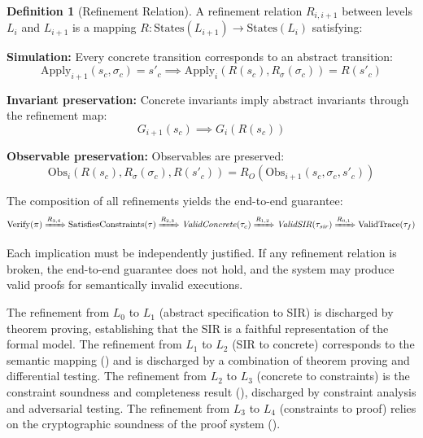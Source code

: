\documentclass[11pt,a4paper]{article}
\theoremstyle{definition}
\newtheorem{definition}{Definition}[section]
\newcommand{\Apply}{\mathrm{Apply}}
\newcommand{\Obs}{\mathrm{Obs}}
\newcommand{\Verify}{\mathrm{Verify}}
\newcommand{\ValidTrace}{\mathrm{ValidTrace}}
\newcommand{\SatisfiesConstraints}{\mathrm{SatisfiesConstraints}}
\begin{document}
\begin{definition}[Refinement Relation]
\label{def:refinement-relation}
A refinement relation $R_{i,i+1}$ between levels $L_i$ and $L_{i+1}$ is a mapping $R: \mathrm{States}(L_{i+1}) \to \mathrm{States}(L_i)$ satisfying:

\noindent\textbf{Simulation:} Every concrete transition corresponds to an abstract transition:
\begin{equation}
\Apply_{i+1}(s_c, \sigma_c) = s'_c \implies \Apply_i(R(s_c), R_\sigma(\sigma_c)) = R(s'_c)
\end{equation}

\noindent\textbf{Invariant preservation:} Concrete invariants imply abstract invariants through the refinement map:
\begin{equation}
G_{i+1}(s_c) \implies G_i(R(s_c))
\end{equation}

\noindent\textbf{Observable preservation:} Observables are preserved:
\begin{equation}
\Obs_i(R(s_c), R_\sigma(\sigma_c), R(s'_c)) = R_O(\Obs_{i+1}(s_c, \sigma_c, s'_c))
\end{equation}
\end{definition}

The composition of all refinements yields the end-to-end guarantee:
\begin{equation}
\Verify(\pi) \xRightarrow{R_{3,4}} \SatisfiesConstraints(\tau) \xRightarrow{R_{2,3}} \mathit{ValidConcrete}(\tau_c) \xRightarrow{R_{1,2}} \mathit{ValidSIR}(\tau_{\mathit{sir}}) \xRightarrow{R_{0,1}} \ValidTrace(\tau_f)
\end{equation}

Each implication must be independently justified. If any refinement relation is broken, the end-to-end guarantee does not hold, and the system may produce valid proofs for semantically invalid executions.

The refinement from $L_0$ to $L_1$ (abstract specification to SIR) is discharged by theorem proving, establishing that the SIR is a faithful representation of the formal model. The refinement from $L_1$ to $L_2$ (SIR to concrete) corresponds to the semantic mapping () and is discharged by a combination of theorem proving and differential testing. The refinement from $L_2$ to $L_3$ (concrete to constraints) is the constraint soundness and completeness result (), discharged by constraint analysis and adversarial testing. The refinement from $L_3$ to $L_4$ (constraints to proof) relies on the cryptographic soundness of the proof system ().
\end{document}
